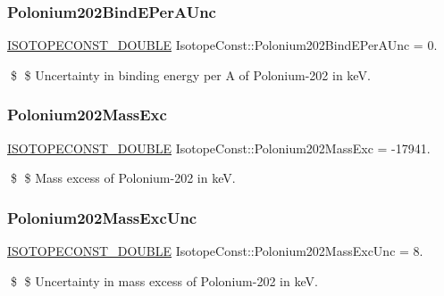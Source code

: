 \subsubsection{\texorpdfstring{Polonium202\+Bind\+E\+Per\+A\+Unc}{Polonium202BindEPerAUnc}}
{\footnotesize\ttfamily \mbox{\hyperlink{group___isotope_const-_macros_ga8f45a7272ce02c0b4c65c44636ed719a}{I\+S\+O\+T\+O\+P\+E\+C\+O\+N\+S\+T\+\_\+\+D\+O\+U\+B\+LE}} Isotope\+Const\+::\+Polonium202\+Bind\+E\+Per\+A\+Unc = 0.}

\$ \$ Uncertainty in binding energy per A of Polonium-\/202 in keV. \mbox{\label{group___isotope_const-_polonium-_po202_ga72e467c19e1c1fd6b2fa5bfdf911a4b8}} 
\subsubsection{\texorpdfstring{Polonium202\+Mass\+Exc}{Polonium202MassExc}}
{\footnotesize\ttfamily \mbox{\hyperlink{group___isotope_const-_macros_ga8f45a7272ce02c0b4c65c44636ed719a}{I\+S\+O\+T\+O\+P\+E\+C\+O\+N\+S\+T\+\_\+\+D\+O\+U\+B\+LE}} Isotope\+Const\+::\+Polonium202\+Mass\+Exc = -\/17941.}

\$ \$ Mass excess of Polonium-\/202 in keV. \mbox{\label{group___isotope_const-_polonium-_po202_ga3b93a33c79bbe2e8ade32634bd0a4950}} 
\subsubsection{\texorpdfstring{Polonium202\+Mass\+Exc\+Unc}{Polonium202MassExcUnc}}
{\footnotesize\ttfamily \mbox{\hyperlink{group___isotope_const-_macros_ga8f45a7272ce02c0b4c65c44636ed719a}{I\+S\+O\+T\+O\+P\+E\+C\+O\+N\+S\+T\+\_\+\+D\+O\+U\+B\+LE}} Isotope\+Const\+::\+Polonium202\+Mass\+Exc\+Unc = 8.}

\$ \$ Uncertainty in mass excess of Polonium-\/202 in keV. \mbox{\label{group___isotope_const-_polonium-_po202_gab95e5c5490b9e3a590d3fe24fb986ae6}} 
